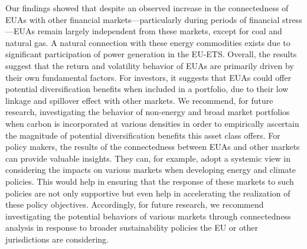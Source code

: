 \documentclass[preprint, 3p,
authoryear]{elsarticle} %
\begin{document}
Our findings showed that despite an observed increase in the
connectedness of EUAs with other financial markets---particularly during
periods of financial stress---EUAs remain largely independent from these
markets, except for coal and natural gas. A natural connection with
these energy commodities exists due to significant participation of
power generation in the EU-ETS. Overall, the results suggest that the
return and volatility behavior of EUAs are primarily driven by their own
fundamental factors. For investors, it suggests that EUAs could offer
potential diversification benefits when included in a portfolio, due to
their low linkage and spillover effect with other markets. We recommend,
for future research, investigating the behavior of non-energy and broad
market portfolios when carbon is incorporated at various densities in
order to empirically ascertain the magnitude of potential
diversification benefits this asset class offers. For policy makers, the
results of the connectedness between EUAs and other markets can provide
valuable insights. They can, for example, adopt a systemic view in
considering the impacts on various markets when developing energy and
climate policies. This would help in ensuring that the response of these
markets to such policies are not only supportive but even help in
accelerating the realization of these policy objectives. Accordingly,
for future research, we recommend investigating the potential behaviors
of various markets through connectedness analysis in response to broader
sustainability policies the EU or other jurisdictions are considering.

\newpage

\appendix
\end{document}

